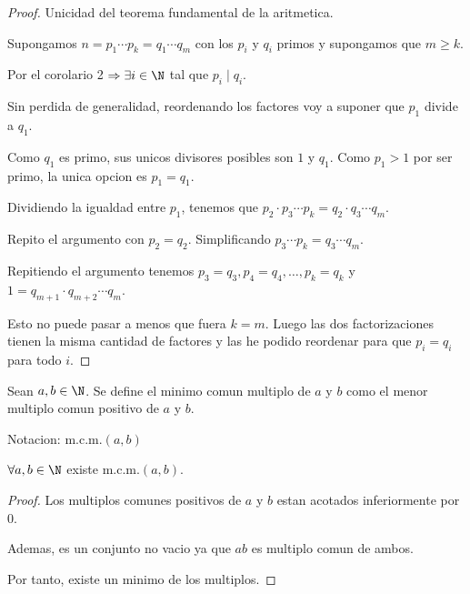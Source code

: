\begin{proof}
	Unicidad del teorema fundamental de la aritmetica.

	Supongamos \(n = p_1 \cdots p_k = q_1 \cdots q_m \) con los \(p_i \) y \(q_i \) primos y supongamos que \(m \geq k \).

	Por el corolario 2 \(\Rightarrow \exists i \in \N \) tal que \(p_i \mid q_i\).

	Sin perdida de generalidad, reordenando los factores voy a suponer que \(p_1 \) divide a \(q_1 \).

	Como \(q_1 \) es primo, sus unicos divisores posibles son \(1 \) y \(q_1 \). Como \(p_1 > 1 \) por ser primo, la unica opcion es \(p_1 = q_1 \).

	Dividiendo la igualdad entre \(p_1 \), tenemos que \(p_2 \cdot p_3 \cdots p_k = q_2 \cdot q_3 \cdots q_m \).

	Repito el argumento con \(p_2 = q_2 \). Simplificando \(p_3 \cdots p_k = q_3 \cdots q_m \).

	Repitiendo el argumento tenemos \(p_3 = q_3, p_4 = q_4, \ldots, p_k = q_k \) y \(1 = q_{m+1} \cdot q_{m+2} \cdots q_m\).

	Esto no puede pasar a menos que fuera \(k = m \). Luego las dos factorizaciones tienen la misma cantidad de factores y las he podido reordenar para que \(p_i = q_i \) para todo \(i \).

\end{proof}

\begin{definition}
	Sean \(a,b \in \N\). Se define el minimo comun multiplo de \(a \) y \(b \) como el menor multiplo comun positivo de \(a \) y \(b \).

	Notacion: \(\mathrm{m.c.m.}(a,b) \)
\end{definition}

\begin{proposition}
	\(\forall a,b \in \N \) existe \(\mathrm{m.c.m.}(a,b) \).
\end{proposition}
\begin{proof}
	Los multiplos comunes positivos de \(a \) y \(b \) estan acotados inferiormente por 0.

	Ademas, es un conjunto no vacio ya que \(ab \) es multiplo comun de ambos.

	Por tanto, existe un minimo de los multiplos.
\end{proof}


